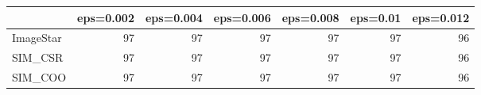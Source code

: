 \begin{tabular}{lrrrrrr}
\hline
           &   eps=0.002 &   eps=0.004 &   eps=0.006 &   eps=0.008 &   eps=0.01 &   eps=0.012 \\
\hline
 ImageStar &          97 &          97 &          97 &          97 &         97 &          96 \\
 SIM\_CSR   &          97 &          97 &          97 &          97 &         97 &          96 \\
 SIM\_COO   &          97 &          97 &          97 &          97 &         97 &          96 \\
\hline
\end{tabular}
